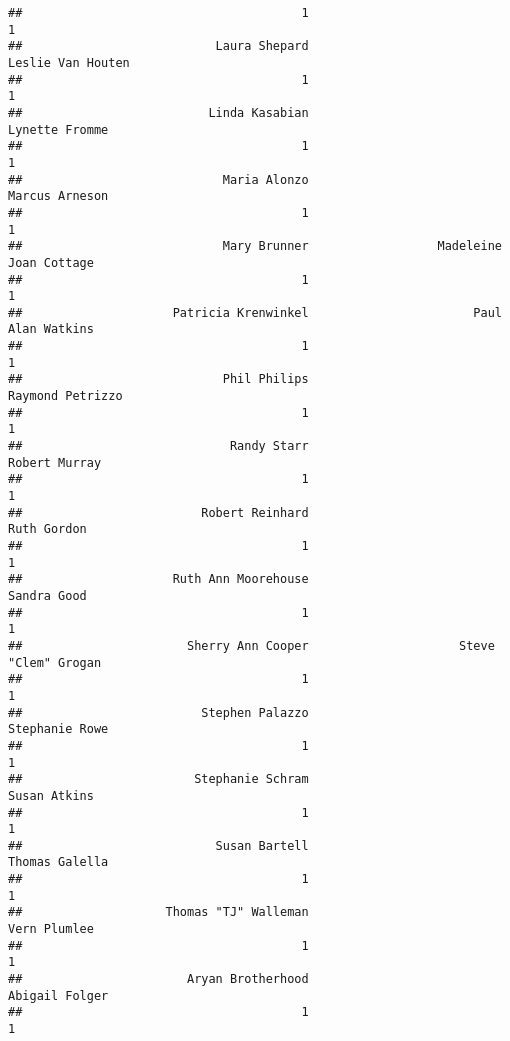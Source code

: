 \documentclass[
]{article}
\begin{document}
\begin{verbatim}
##                                       1                                       1 
##                           Laura Shepard                       Leslie Van Houten 
##                                       1                                       1 
##                          Linda Kasabian                          Lynette Fromme 
##                                       1                                       1 
##                            Maria Alonzo                          Marcus Arneson 
##                                       1                                       1 
##                            Mary Brunner                  Madeleine Joan Cottage 
##                                       1                                       1 
##                     Patricia Krenwinkel                       Paul Alan Watkins 
##                                       1                                       1 
##                            Phil Philips                        Raymond Petrizzo 
##                                       1                                       1 
##                             Randy Starr                           Robert Murray 
##                                       1                                       1 
##                         Robert Reinhard                             Ruth Gordon 
##                                       1                                       1 
##                     Ruth Ann Moorehouse                             Sandra Good 
##                                       1                                       1 
##                       Sherry Ann Cooper                     Steve "Clem" Grogan 
##                                       1                                       1 
##                         Stephen Palazzo                          Stephanie Rowe 
##                                       1                                       1 
##                        Stephanie Schram                            Susan Atkins 
##                                       1                                       1 
##                           Susan Bartell                          Thomas Galella 
##                                       1                                       1 
##                    Thomas "TJ" Walleman                            Vern Plumlee 
##                                       1                                       1 
##                       Aryan Brotherhood                          Abigail Folger 
##                                       1                                       1 

\end{verbatim}
\end{document}
